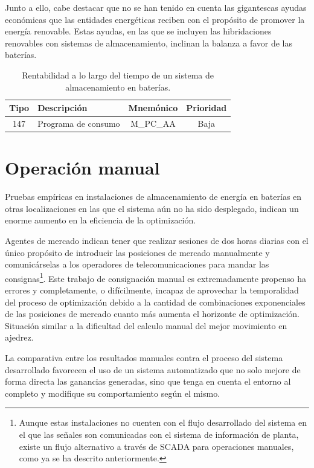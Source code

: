 Junto a ello, cabe destacar que no se han tenido en cuenta las gigantescas ayudas económicas que las entidades energéticas reciben con el propósito de promover la energía renovable. Estas ayudas, en las que se incluyen las hibridaciones renovables con sistemas de almacenamiento, inclinan la balanza a favor de las baterías.

\begin{table}[ht]
  \centering
  \begin{tabular}{|c|p{7.5cm}|c|c|}
    \hline
    Tipo & Descripción         & Mnemónico & Prioridad\\
    \hline
    147  & Programa de consumo & M\_PC\_AA & Baja     \\
    \hline
  \end{tabular}
  \caption[Rentabilidad a lo largo del tiempo de un sistema de almacenamiento en baterías.]{Rentabilidad a lo largo del tiempo de un sistema de almacenamiento en baterías.}
  \label{tab:rentabilidad-bess}
\end{table}

\section{Operación manual}
\label{makereference7.2}

Pruebas empíricas en instalaciones de almacenamiento de energía en baterías en otras localizaciones en las que el sistema aún no ha sido desplegado, indican un enorme aumento en la eficiencia de la optimización.

Agentes de mercado indican tener que realizar sesiones de dos horas diarias con el único propósito de introducir las posiciones de mercado manualmente y comunicárselas a los operadores de telecomunicaciones para mandar las consignas\footnote{Aunque estas instalaciones no cuenten con el flujo desarrollado del sistema en el que las señales son comunicadas con el sistema de información de planta, existe un flujo alternativo a través de SCADA para operaciones manuales, como ya se ha descrito anteriormente.}. Este trabajo de consignación manual es extremadamente propenso ha errores y completamente, o difícilmente, incapaz de aprovechar la temporalidad del proceso de optimización debido a la cantidad de combinaciones exponenciales de las posiciones de mercado cuanto más aumenta el horizonte de optimización. Situación similar a la dificultad del calculo manual del mejor movimiento en ajedrez.

La comparativa entre los resultados manuales contra el proceso del sistema desarrollado favorecen el uso de un sistema automatizado que no solo mejore de forma directa las ganancias generadas, sino que tenga en cuenta el entorno al completo y modifique su comportamiento según el mismo.

